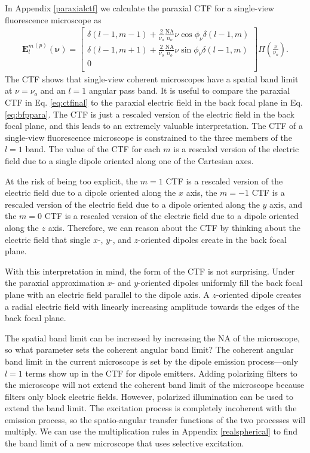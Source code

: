 \documentclass[11pt]{article}
\providecommand{\mb}[1]{\mathbf{#1}}
\providecommand{\bs}[1]{\boldsymbol{#1}}
\begin{document}
In Appendix \ref{paraxialctf} we calculate the paraxial CTF for a single-view
fluorescence microscope as
\begin{align}
  {\mb{E}_l^m}^{(p)}(\bs{\nu}) =
\begin{bmatrix}
  \delta(l-1, m-1) + \frac{2}{\nu_o}\frac{\text{NA}}{n_o}\nu\cos\phi_\nu\delta(l-1, m)\\
  \delta(l-1, m+1) + \frac{2}{\nu_o}\frac{\text{NA}}{n_o}\nu\sin\phi_\nu\delta(l-1, m)\\
  0\\
  \end{bmatrix}\Pi\left(\frac{\nu}{\nu_o}\right).\label{eq:ctfinal}
\end{align}
The CTF shows that single-view coherent microscopes have a spatial band limit at
$\nu = \nu_o$ and an $l=1$ angular pass band. It is useful to compare the paraxial
CTF in Eq. \ref{eq:ctfinal} to the paraxial electric field in the back focal
plane in Eq. \ref{eq:bfppara}. The CTF is just a rescaled version of the
electric field in the back focal plane, and this leads to an extremely valuable
interpretation. The CTF of a single-view fluorescence microscope is constrained
to the three members of the $l=1$ band. The value of the CTF for each $m$ is a
rescaled version of the electric field due to a single dipole oriented along one
of the Cartesian axes.

At the risk of being too explicit, the $m=1$ CTF is a rescaled version of the
electric field due to a dipole oriented along the $x$ axis, the $m=-1$ CTF is a
rescaled version of the electric field due to a dipole oriented along the $y$
axis, and the $m=0$ CTF is a rescaled version of the electric field due to a
dipole oriented along the $z$ axis. Therefore, we can reason about the CTF by
thinking about the electric field that single $x$-, $y$-, and $z$-oriented dipoles
create in the back focal plane. 

With this interpretation in mind, the form of the CTF is not surprising. Under
the paraxial approximation $x$- and $y$-oriented dipoles uniformly fill the back
focal plane with an electric field parallel to the dipole axis. A $z$-oriented
dipole creates a radial electric field with linearly increasing amplitude towards
the edges of the back focal plane.

The spatial band limit can be increased by increasing the NA of the microscope,
so what parameter sets the coherent angular band limit? The coherent angular
band limit in the current microscope is set by the dipole emission
process---only $l=1$ terms show up in the CTF for dipole emitters. Adding
polarizing filters to the microscope will not extend the coherent band limit of
the microscope because filters only block electric fields. However, polarized
illumination can be used to extend the band limit. The excitation process is
completely incoherent with the emission process, so the spatio-angular transfer
functions of the two processes will multiply. We can use the multiplication
rules in Appendix \ref{realspherical} to find the band limit of a new microscope
that uses selective excitation.
\end{document}
